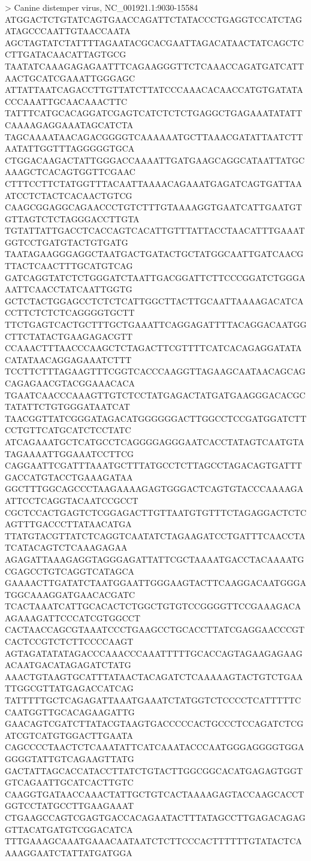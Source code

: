 > Canine distemper virus, NC_001921.1:9030-15584
ATGGACTCTGTATCAGTGAACCAGATTCTATACCCTGAGGTCCATCTAGATAGCCCAATTGTAACCAATA
AGCTAGTATCTATTTTAGAATACGCACGAATTAGACATAACTATCAGCTCCTTGATACAACATTAGTGCG
TAATATCAAAGAGAGAATTTCAGAAGGGTTCTCAAACCAGATGATCATTAACTGCATCGAAATTGGGAGC
ATTATTAATCAGACCTTGTTATCTTATCCCAAACACAACCATGTGATATACCCAAATTGCAACAAACTTC
TATTTCATGCACAGGATCGAGTCATCTCTCTGAGGCTGAGAAATATATTCAAAAGAGGAAATAGCATCTA
TAGCAAAATAACAGACGGGGTCAAAAAATGCTTAAACGATATTAATCTTAATATTGGTTTAGGGGGTGCA
CTGGACAAGACTATTGGGACCAAAATTGATGAAGCAGGCATAATTATGCAAAGCTCACAGTGGTTCGAAC
CTTTCCTTCTATGGTTTACAATTAAAACAGAAATGAGATCAGTGATTAAATCCTCTACTCACAACTGTCG
CAAGCGGAGGCAGAACCCTGTCTTTGTAAAAGGTGAATCATTGAATGTGTTAGTCTCTAGGGACCTTGTA
TGTATTATTGACCTCACCAGTCACATTGTTTATTACCTAACATTTGAAATGGTCCTGATGTACTGTGATG
TAATAGAAGGGAGGCTAATGACTGATACTGCTATGGCAATTGATCAACGTTACTCAACTTTGCATGTCAG
GATCAGGTATCTCTGGGATCTAATTGACGGATTCTTCCCGGATCTGGGAAATTCAACCTATCAATTGGTG
GCTCTACTGGAGCCTCTCTCATTGGCTTACTTGCAATTAAAAGACATCACCTTCTCTCTCAGGGGTGCTT
TTCTGAGTCACTGCTTTGCTGAAATTCAGGAGATTTTACAGGACAATGGCTTCTATACTGAAGAGACGTT
CCAAACTTTAACCCAAGCTCTAGACTTCGTTTTCATCACAGAGGATATACATATAACAGGAGAAATCTTT
TCCTTCTTTAGAAGTTTCGGTCACCCAAGGTTAGAAGCAATAACAGCAGCAGAGAACGTACGGAAACACA
TGAATCAACCCAAAGTTGTCTCCTATGAGACTATGATGAAGGGACACGCTATATTCTGTGGGATAATCAT
TAACGGTTATCGGGATAGACATGGGGGGACTTGGCCTCCGATGGATCTTCCTGTTCATGCATCTCCTATC
ATCAGAAATGCTCATGCCTCAGGGGAGGGAATCACCTATAGTCAATGTATAGAAAATTGGAAATCCTTCG
CAGGAATTCGATTTAAATGCTTTATGCCTCTTAGCCTAGACAGTGATTTGACCATGTACCTGAAAGATAA
GGCTTTGGCAGCCCTAAGAAAAGAGTGGGACTCAGTGTACCCAAAAGAATTCCTCAGGTACAATCCGCCT
CGCTCCACTGAGTCTCGGAGACTTGTTAATGTGTTTCTAGAGGACTCTCAGTTTGACCCTTATAACATGA
TTATGTACGTTATCTCAGGTCAATATCTAGAAGATCCTGATTTCAACCTATCATACAGTCTCAAAGAGAA
AGAGATTAAAGAGGTAGGGAGATTATTCGCTAAAATGACCTACAAAATGCGAGCCTGTCAGGTCATAGCA
GAAAACTTGATATCTAATGGAATTGGGAAGTACTTCAAGGACAATGGGATGGCAAAGGATGAACACGATC
TCACTAAATCATTGCACACTCTGGCTGTGTCCGGGGTTCCGAAAGACAAGAAAGATTCCCATCGTGGCCT
CACTAACCAGCGTAAATCCCTGAAGCCTGCACCTTATCGAGGAACCCGTCACTCCGTCTCTTCCCCAAGT
AGTAGATATATAGACCCAAACCCAAATTTTTGCACCAGTAGAAGAGAAGACAATGACATAGAGATCTATG
AAACTGTAAGTGCATTTATAACTACAGATCTCAAAAAGTACTGTCTGAATTGGCGTTATGAGACCATCAG
TATTTTTGCTCAGAGATTAAATGAAATCTATGGTCTCCCCTCATTTTTCCAATGGTTGCACAGAAGATTG
GAACAGTCGATCTTATACGTAAGTGACCCCCACTGCCCTCCAGATCTCGATCGTCATGTGGACTTGAATA
CAGCCCCTAACTCTCAAATATTCATCAAATACCCAATGGGAGGGGTGGAGGGGTATTGTCAGAAGTTATG
GACTATTAGCACCATACCTTATCTGTACTTGGCGGCACATGAGAGTGGTGTCAGAATTGCATCACTTGTC
CAAGGTGATAACCAAACTATTGCTGTCACTAAAAGAGTACCAAGCACCTGGTCCTATGCCTTGAAGAAAT
CTGAAGCCAGTCGAGTGACCACAGAATACTTTATAGCCTTGAGACAGAGGTTACATGATGTCGGACATCA
TTTGAAAGCAAATGAAACAATAATCTCTTCCCACTTTTTTGTATACTCAAAAGGAATCTATTATGATGGA
